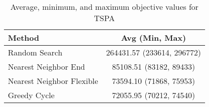 \begin{table}[h!]
\centering
\begin{tabular}{lc}
\hline
Method & Avg (Min, Max) \\
\hline
Random Search & 264431.57 (233614, 296772) \\
Nearest Neighbor End & 85108.51 (83182, 89433) \\
Nearest Neighbor Flexible & 73594.10 (71868, 75953) \\
Greedy Cycle & 72055.95 (70212, 74540) \\
\hline
\end{tabular}
\caption{Average, minimum, and maximum objective values for TSPA}
\label{tab:TSPA_results}
\end{table}
